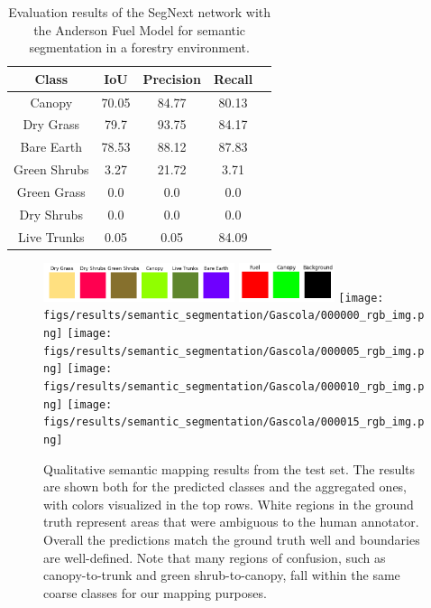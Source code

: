 \begin{table}[ht!]
    \centering
\begin{tabular}{ccccc}
\toprule
\textbf{Class} & \textbf{IoU} & \textbf{Precision} & \textbf{Recall} \\ \midrule
Canopy & 70.05 & 84.77 & 80.13 \\
Dry Grass & 79.7 & 93.75 & 84.17 \\
Bare Earth & 78.53 & 88.12 & 87.83 \\
Green Shrubs & 3.27 & 21.72 & 3.71 \\
Green Grass & 0.0 & 0.0 & 0.0 \\
Dry Shrubs & 0.0 & 0.0 & 0.0 \\
Live Trunks & 0.05 & 0.05 & 84.09 \\
\bottomrule
\end{tabular}
\caption{Evaluation results of the SegNext \cite{Guo2022SegNeXt:Segmentation} network with the Anderson Fuel Model for semantic segmentation in a forestry environment.}
\label{tab:results:semantic_eval}
\end{table}


\begin{figure}[h!]
   \centering
   \includegraphics[width=0.5\textwidth]{figs/results/semantic_segmentation/Gascola/safeforest_all_classes_flat.png}
   \includegraphics[width=0.25\textwidth]{figs/results/semantic_segmentation/Gascola/safeforest_classmap_compressed_flat.png}
   \texttt{[image: figs/results/semantic\_segmentation/Gascola/000000\_rgb\_img.png]}
   \vspace{0pt}
   \texttt{[image: figs/results/semantic\_segmentation/Gascola/000005\_rgb\_img.png]}
   \vspace{0pt}
   \texttt{[image: figs/results/semantic\_segmentation/Gascola/000010\_rgb\_img.png]}
   \vspace{0pt}
   \texttt{[image: figs/results/semantic\_segmentation/Gascola/000015\_rgb\_img.png]}
   \vspace{0pt}
   \caption{
   Qualitative semantic mapping results from the test set. The results are shown both for the predicted classes and the aggregated ones, with colors visualized in the top rows.
   White regions in the ground truth represent areas that were ambiguous to the human annotator. Overall the predictions match the ground truth well and boundaries are well-defined. Note that many regions of confusion, such as canopy-to-trunk and green shrub-to-canopy, fall within the same coarse classes for our mapping purposes.
   }
   \label{fig:results:semantic_gascola_qualitative}                %
\end{figure}

